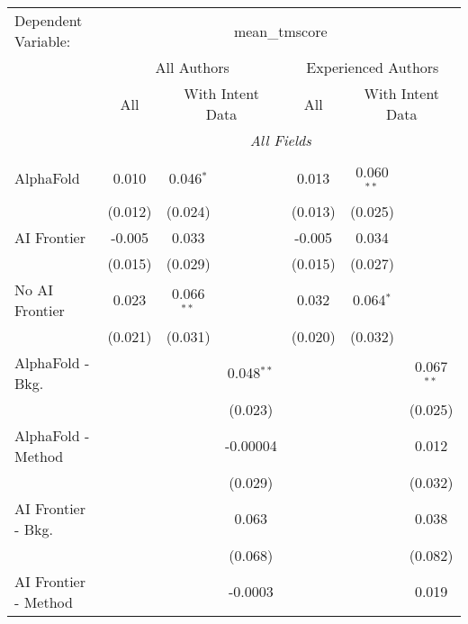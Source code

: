 \begingroup
\centering
\begin{tabular}{lcccccc}
   \tabularnewline \midrule \midrule
   Dependent Variable: & \multicolumn{6}{c}{mean\_tmscore}\\
 & \multicolumn{3}{c}{All Authors} & \multicolumn{3}{c}{Experienced Authors} \\
\cmidrule(lr){2-4} \cmidrule(lr){5-7}
 & \multicolumn{1}{c}{All} & \multicolumn{2}{c}{With Intent Data} & \multicolumn{1}{c}{All} & \multicolumn{2}{c}{With Intent Data} \\
\cmidrule(lr){2-2} \cmidrule(lr){3-4} \cmidrule(lr){5-5} \cmidrule(lr){6-7}
 & \multicolumn{6}{c}{\textit{All Fields}} \\ \\
   AlphaFold               & 0.010   & 0.046$^{*}$  &              & 0.013   & 0.060$^{**}$ &   \\   
                           & (0.012) & (0.024)      &              & (0.013) & (0.025)      &   \\   
   AI Frontier             & -0.005  & 0.033        &              & -0.005  & 0.034        &   \\   
                           & (0.015) & (0.029)      &              & (0.015) & (0.027)      &   \\   
   No AI Frontier          & 0.023   & 0.066$^{**}$ &              & 0.032   & 0.064$^{*}$  &   \\   
                           & (0.021) & (0.031)      &              & (0.020) & (0.032)      &   \\   
   AlphaFold - Bkg.        &         &              & 0.048$^{**}$ &         &              & 0.067$^{**}$\\   
                           &         &              & (0.023)      &         &              & (0.025)\\   
   AlphaFold - Method      &         &              & -0.00004     &         &              & 0.012\\   
                           &         &              & (0.029)      &         &              & (0.032)\\   
   AI Frontier - Bkg.      &         &              & 0.063        &         &              & 0.038\\   
                           &         &              & (0.068)      &         &              & (0.082)\\   
   AI Frontier - Method    &         &              & -0.0003      &         &              & 0.019\\   

\end{tabular}
